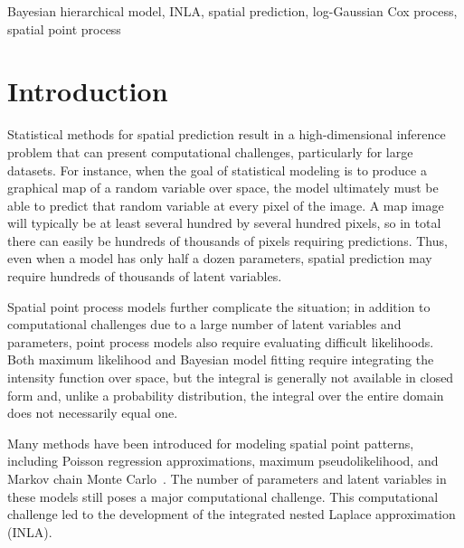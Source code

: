\documentclass[]{interact}
\begin{document}
\begin{keywords}
Bayesian hierarchical model, INLA, spatial prediction, log-Gaussian Cox process, spatial point process
\end{keywords}


\section{Introduction}
\label{intro}


Statistical methods for spatial prediction result in a high-dimensional
inference problem that can present computational challenges, particularly for
large datasets. For instance, when the goal of statistical modeling is to
produce a graphical map of a random variable over space, the model ultimately
must be able to predict that random variable at every pixel of the image. A map
image will typically be at least several hundred by several hundred pixels, so
in total there can easily be hundreds of thousands of pixels requiring
predictions. Thus, even when a model has only half a dozen parameters, spatial
prediction may require hundreds of thousands of latent variables.

Spatial point process models further complicate the situation; in addition to
computational challenges due to a large number of latent variables and
parameters, point process models also require evaluating difficult
likelihoods. Both maximum likelihood and Bayesian model fitting require
integrating the intensity function over space, but the integral is generally
not available in closed form and, unlike a probability distribution, the
integral over the entire domain does not necessarily equal one.

Many methods have been introduced for modeling spatial point patterns,
including Poisson regression approximations, maximum pseudolikelihood, and
Markov chain Monte
Carlo~\cite{bermanturner,baddeleyetal,baddeleyturner,moellerwaagepetersen}.
The number of parameters and latent variables in these models still poses a
major computational challenge. This computational challenge led to the
development of the integrated nested Laplace approximation (INLA).
\end{document}
